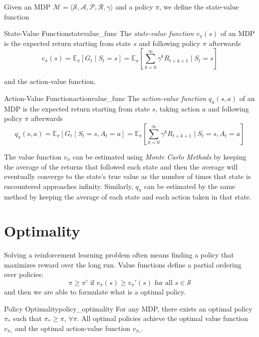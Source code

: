 Given an MDP $\mathcal{M} = \langle \mathcal{S}, \mathcal{A}, \mathcal{P}, \mathcal{R}, \gamma \rangle$ and a policy $\pi$, we define the state-value function
\begin{definition}{State-Value Function}{statevalue_func}
      The \textit{state-value function} $v_\pi(s)$ of an MDP is the expected return starting from state $s$ and following policy $\pi$ afterwards
      \begin{equation}\label{eq:statevalue_func_def}
            v_\pi(s) = \mathbb{E}_\pi[G_t \mid S_t = s] = \mathbb{E}_\pi\left[\sum^{\infty}_{k=0}\gamma^kR_{t+k+1} \mid S_t = s\right]
      \end{equation}  
\end{definition}
and the action-value function.
\begin{definition}{Action-Value Function}{actionvalue_func}
      The \textit{action-value function} $q_\pi(s, a)$ of an MDP is the expected return starting from state $s$, taking action $a$ and following policy $\pi$ afterwards
      \begin{equation}\label{eq:actionvalue_func_def}
            q_\pi(s, a) = \mathbb{E}_\pi[G_t \mid S_t = s, A_t = a] = \mathbb{E}_\pi\left[\sum^{\infty}_{k=0}\gamma^kR_{t+k+1}\mid S_t = s, A_t = a\right]
      \end{equation}  
\end{definition}
The value function $v_\pi$ can be estimated using \textit{Monte Carlo Methods} by keeping the average of the returns that followed each state and then the average will eventually converge to the state's true value as the number of times that state is encountered approaches infinity. Similarly, $q_\pi$ can be estimated by the same method by keeping the average of each state and each action taken in that state.

\section{Optimality}
Solving a reinforcement learning problem often means finding a policy that maximizes reward over the long run. Value functions define a partial ordering over policies:
\[
\pi \geq \pi' \text{ if } v_\pi(s) \geq v_\pi'(s) \text{ for all } s \in \mathcal{S}      
\]
and then we are able to formulate what is a optimal policy.
\begin{theorem}{Policy Optimality}{policy_optimality}
      For any MDP, there exists an optimal policy $\pi_*$ such that $\pi_* \geq \pi$, $\forall \pi$. All optimal policies achieve the optimal value function $v_{\pi_*}$ and the optimal action-value function $v_{\pi_*}$.  
\end{theorem}


